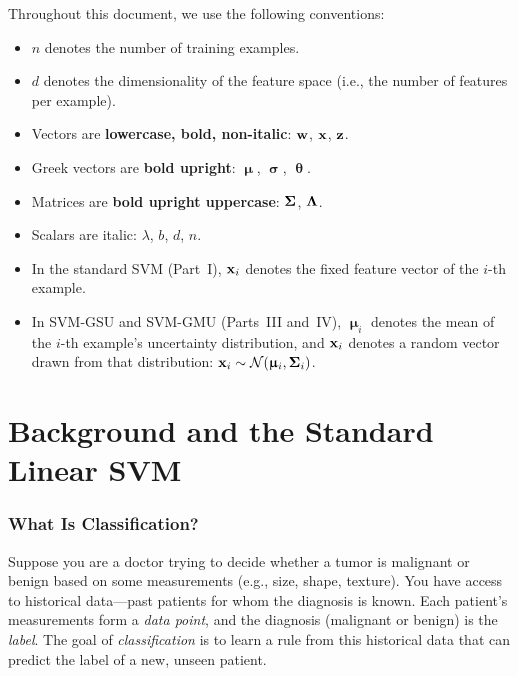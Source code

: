 \documentclass[11pt, letterpaper]{article}
\newcommand{\bSigma}{\vb{\Sigma}}
\newcommand{\bsigma}{\boldsymbol{\upsigma}}
\newcommand{\bmu}{\boldsymbol{\upmu}}
\newcommand{\bLambda}{\vb{\Lambda}}
\newcommand{\btheta}{\boldsymbol{\uptheta}}
\newcommand{\Norm}{\mathcal{N}}
\begin{document}
Throughout this document, we use the following conventions:
\begin{itemize}[leftmargin=2em]
    \item $n$ denotes the number of training examples.
    \item $d$ denotes the dimensionality of the feature space (i.e., the number of features per example).
    \item Vectors are \textbf{lowercase, bold, non-italic}: $\vb{w}$, $\vb{x}$, $\vb{z}$.
    \item Greek vectors are \textbf{bold upright}: $\bmu$, $\bsigma$, $\btheta$.
    \item Matrices are \textbf{bold upright uppercase}: $\bSigma$, $\bLambda$.
    \item Scalars are italic: $\lambda$, $b$, $d$, $n$.
    \item In the standard SVM (Part~I), $\vb{x}_i$ denotes the fixed feature vector of the $i$-th example.
    \item In SVM-GSU and SVM-GMU (Parts~III and~IV), $\bmu_i$ denotes the mean of the $i$-th example's uncertainty distribution, and $\vb{x}_i$ denotes a random vector drawn from that distribution: $\vb{x}_i \sim \Norm(\bmu_i, \bSigma_i)$.
\end{itemize}

\newpage

\part{Background and the Standard Linear SVM}

\section{What Is Classification?}

Suppose you are a doctor trying to decide whether a tumor is malignant or benign based on some measurements (e.g., size, shape, texture). You have access to historical data---past patients for whom the diagnosis is known. Each patient's measurements form a \emph{data point}, and the diagnosis (malignant or benign) is the \emph{label}. The goal of \emph{classification} is to learn a rule from this historical data that can predict the label of a new, unseen patient.
\end{document}
